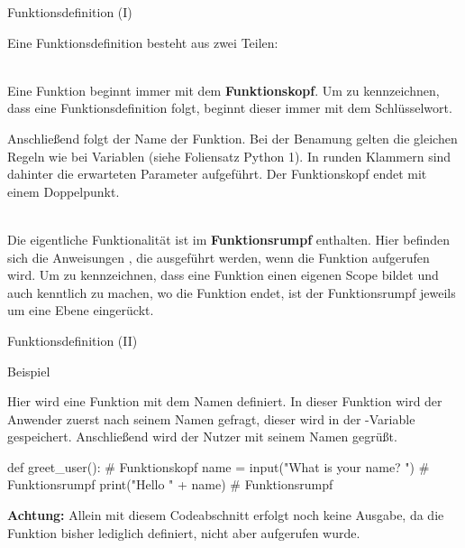    \begin{frame}{Funktionsdefinition (I)}
    
        Eine Funktionsdefinition besteht aus zwei Teilen:\\~\
        
        Eine Funktion beginnt immer mit dem \textbf{Funktionskopf}. Um zu kennzeichnen, dass eine Funktionsdefinition folgt, beginnt dieser immer mit dem  Schlüsselwort. 
        
        Anschließend folgt der Name der Funktion. Bei der Benamung gelten die gleichen Regeln wie bei Variablen (siehe Foliensatz Python 1). In runden Klammern sind dahinter die erwarteten Parameter aufgeführt. Der Funktionskopf endet mit einem Doppelpunkt.\\~\
        
        Die eigentliche Funktionalität ist im \textbf{Funktionsrumpf} enthalten. Hier befinden sich die Anweisungen , die ausgeführt werden, wenn die Funktion aufgerufen wird. Um zu kennzeichnen, dass eine Funktion einen eigenen Scope bildet und auch kenntlich zu machen, wo die Funktion endet, ist der Funktionsrumpf jeweils um eine Ebene eingerückt.
    \end{frame}
    
    \begin{frame}[fragile]{Funktionsdefinition (II)}
        
        \begin{exampleblock}{Beispiel}
        
            Hier wird eine Funktion mit dem Namen  definiert. In dieser Funktion wird der Anwender zuerst nach seinem Namen gefragt, dieser wird in der -Variable gespeichert. Anschließend wird der Nutzer mit seinem Namen gegrüßt.
        
\begin{pythoncode}
def greet_user():                          # Funktionskopf
    name = input("What is your name? ")     # Funktionsrumpf
    print("Hello " + name)                  # Funktionsrumpf
\end{pythoncode}

            \textbf{Achtung:} Allein mit diesem Codeabschnitt erfolgt noch keine Ausgabe, da die Funktion bisher lediglich definiert, nicht aber aufgerufen wurde.
        
        \end{exampleblock}
    \end{frame}
    
